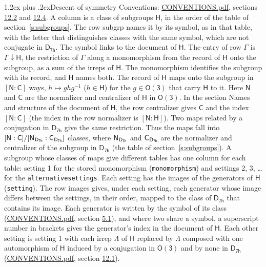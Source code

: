 \documentclass[10pt,a4paper]{article}
\makeatletter
\renewcommand\section{\@startsection{section}{1}{\z@}{-3ex plus -1ex minus -.2ex}%
  {1.2ex plus .2ex}{\normalfont\large\sffamily\bfseries\color{parttitle}}}
\numberwithin{equation}{section}
\newcommand{\grp}[1]{\mathsf{#1}}
\newcommand{\grpindex}[2]{[#1 : #2]}
\newcommand{\restr}[2]{#1\!\downarrow#2}
\newcommand{\hairsp}{\mkern1mu}
\makeatother
\begin{document}
\section{Descent of symmetry}\label{s:subduction}
Conventions: \href{../../CONVENTIONS.pdf}{CONVENTIONS.pdf}, sections \href{../../CONVENTIONS.pdf\#conv.12.2}{12.2} and \href{../../CONVENTIONS.pdf\#conv.12.4}{12.4}.
A column is a class of subgroups $\grp{H}$, in the order of the table of section~\ref{s:subgroups}. The row subgrp names it by its symbol, as in that table, with the letter that distinguishes classes with the same symbol, which are not conjugate in $\grp{D_{7h}}$. The symbol links to the document of $\grp{H}$. The entry of row $\Gamma$ is $\restr{\Gamma}{\grp{H}}$, the restriction of $\Gamma$ along a monomorphism from the record of $\grp{H}$ onto the subgroup, as a sum of the irreps of $\grp{H}$. The monomorphism identifies the subgroup with its record, and $\grp{H}$ names both. \label{n:group.normalizer.o3}\label{n:group.centralizer.o3}The record of $\grp{H}$ maps onto the subgroup in $\grpindex{\grp{N}}{\grp{C}}$ ways, $h \mapsto g h g^{-1}$ ($h \in \grp{H}$) for the $g \in \grp{O(3)}$ that carry $\grp{H}$ to it. Here $\grp{N}$ and $\grp{C}$ are the normalizer and centralizer of $\grp{H}$ in \href{O3.pdf}{$\grp{O(3)}$}. In the section Names and structure of the document of $\grp{H}$, the row centralizer gives $\grp{C}$ and the index $\grpindex{\grp{N}}{\grp{C}}$ (the index in the row normalizer is $\grpindex{\grp{N}}{\grp{H}}$). Two maps related by a conjugation in $\grp{D_{7h}}$ give the same restriction. Thus the maps fall into $\grpindex{\grp{N}}{\grp{C}}/\grpindex{\grp{N}_{\hairsp \grp{D_{7h}}}}{\grp{C}_{\hairsp \grp{D_{7h}}}}$ classes, where $\grp{N}_{\hairsp \grp{D_{7h}}}$ and $\grp{C}_{\hairsp \grp{D_{7h}}}$ are the normalizer and centralizer of the subgroup in $\grp{D_{7h}}$ (the table of section~\ref{s:subgroups}). \label{n:head.setting}A subgroup whose classes of maps give different tables has one column for each table: setting 1 for the stored monomorphism (\texttt{monomorphism}) and settings 2, 3, \dots{} for the \texttt{alternativesettings}. Each setting has the images of the generators of $\grp{H}$ (\texttt{setting}). \label{n:head.images}The row images gives, under each setting, each generator whose image differs between the settings, in their order, mapped to the class of $\grp{D_{7h}}$ that contains its image. Each generator is written by the symbol of its class (\href{../../CONVENTIONS.pdf}{CONVENTIONS.pdf}, section \href{../../CONVENTIONS.pdf\#conv.5.1}{5.1}), and where two share a symbol, a superscript number in brackets gives the generator's index in the document of $\grp{H}$. \label{n:irrep.Delta}Each other setting is setting 1 with each irrep $\Lambda$ of $\grp{H}$ replaced by $\Lambda$ composed with one automorphism of $\grp{H}$ induced by a conjugation in \href{O3.pdf}{$\grp{O(3)}$} and by none in $\grp{D_{7h}}$ (\href{../../CONVENTIONS.pdf}{CONVENTIONS.pdf}, section \href{../../CONVENTIONS.pdf\#conv.12.1}{12.1}).
\end{document}
